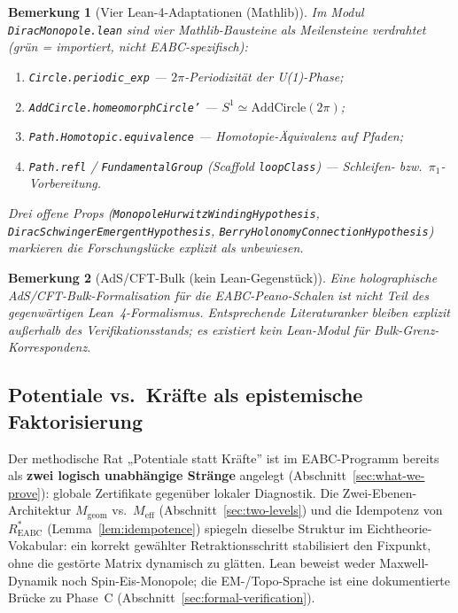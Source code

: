 \documentclass[11pt,a4paper]{article}
\newtheorem{remark}{Bemerkung}
\begin{document}
	\begin{remark}[Vier Lean-4-Adaptationen (Mathlib)]
		Im Modul \texttt{DiracMonopole.lean} sind vier Mathlib-Bausteine als Meilensteine
		verdrahtet (grün = importiert, nicht EABC-spezifisch):
		\begin{enumerate}
			\item \texttt{Circle.periodic\_exp} --- $2\pi$-Periodizität der U(1)-Phase;
			\item \texttt{AddCircle.homeomorphCircle'} --- $S^1 \simeq \mathrm{AddCircle}(2\pi)$;
			\item \texttt{Path.Homotopic.equivalence} --- Homotopie-Äquivalenz auf Pfaden;
			\item \texttt{Path.refl} / \texttt{FundamentalGroup} (Scaffold \texttt{loopClass}) ---
			Schleifen- bzw.\ $\pi_1$-Vorbereitung.
		\end{enumerate}
		Drei offene Props (\texttt{MonopoleHurwitzWindingHypothesis},
		\texttt{DiracSchwingerEmergentHypothesis},
		\texttt{BerryHolonomyConnectionHypothesis}) markieren die Forschungslücke
		explizit als \emph{unbewiesen}.
	\end{remark}
	
	\begin{remark}[AdS/CFT-Bulk (kein Lean-Gegenstück)]
		Eine holographische AdS/CFT-Bulk-Formalisation für die EABC-Peano-Schalen
		ist nicht Teil des gegenwärtigen Lean~4-Formalismus.
		Entsprechende Literaturanker bleiben explizit außerhalb des Verifikationsstands;
		es existiert kein Lean-Modul für Bulk-Grenz-Korrespondenz.
	\end{remark}
	
	\subsection{Potentiale vs.\ Kräfte als epistemische Faktorisierung}
	\label{sec:potential-vs-force}
	
	Der methodische Rat „Potentiale statt Kräfte'' ist im EABC-Programm bereits als
	\textbf{zwei logisch unabhängige Stränge} angelegt (Abschnitt~\ref{sec:what-we-prove}):
	globale Zertifikate gegenüber lokaler Diagnostik.
	Die Zwei-Ebenen-Architektur $M_{\mathrm{geom}}$ vs.\ $M_{\mathrm{eff}}$
	(Abschnitt~\ref{sec:two-levels}) und die Idempotenz von $R^*_{\mathrm{EABC}}$
	(Lemma~\ref{lem:idempotence}) spiegeln dieselbe Struktur im Eichtheorie-Vokabular:
	ein korrekt gewählter Retraktionsschritt stabilisiert den Fixpunkt,
	ohne die gestörte Matrix dynamisch zu glätten.
	Lean beweist weder Maxwell-Dynamik noch Spin-Eis-Monopole; die EM-/Topo-Sprache
	ist eine dokumentierte Brücke zu Phase~C (Abschnitt~\ref{sec:formal-verification}).
	
\end{document}
